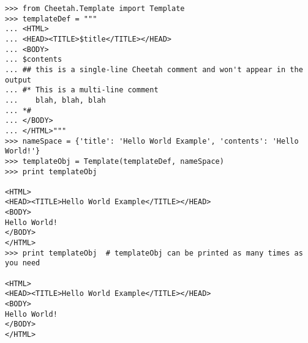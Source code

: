 \begin{verbatim}
>>> from Cheetah.Template import Template
>>> templateDef = """
... <HTML>
... <HEAD><TITLE>$title</TITLE></HEAD>
... <BODY>
... $contents
... ## this is a single-line Cheetah comment and won't appear in the output
... #* This is a multi-line comment
...    blah, blah, blah 
... *#
... </BODY>
... </HTML>"""
>>> nameSpace = {'title': 'Hello World Example', 'contents': 'Hello World!'}
>>> templateObj = Template(templateDef, nameSpace)
>>> print templateObj
 
<HTML>
<HEAD><TITLE>Hello World Example</TITLE></HEAD>
<BODY>
Hello World!
</BODY>
</HTML>
>>> print templateObj  # templateObj can be printed as many times as you need
 
<HTML>
<HEAD><TITLE>Hello World Example</TITLE></HEAD>
<BODY>
Hello World!
</BODY>
</HTML>

\end{verbatim}




